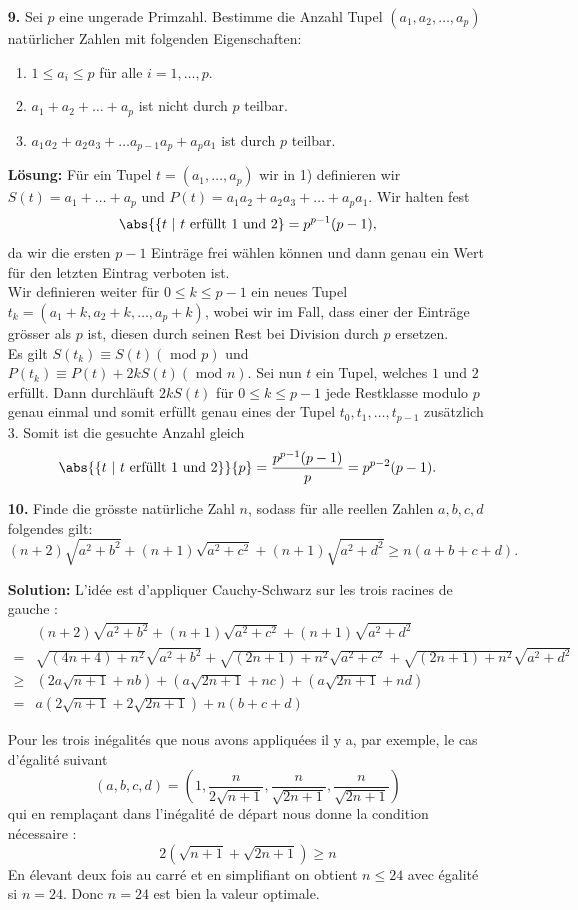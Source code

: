 \documentclass[language=german,style=solution]{smo}
\begin{document}
\begin{enumerate}
\item[\textbf{9.}] Sei $p$ eine ungerade Primzahl. Bestimme die Anzahl Tupel $(a_1,a_2,\dots,a_p)$ natürlicher Zahlen mit folgenden Eigenschaften:
\begin{enumerate}[1)]
\item $1\leq a_i\leq p$ für alle $i=1,\dots,p$.
\item $a_1+a_2+\dots +a_p$ ist nicht durch $p$ teilbar.
\item $a_1a_2 + a_2a_3 +\dots a_{p-1}a_p + a_pa_1$ ist durch $p$ teilbar.
\end{enumerate}

\textbf{Lösung:} Für ein Tupel $t=(a_1,\dots,a_p)$ wir in 1) definieren wir $S(t) = a_1+\dots +a_p$ und $P(t) = a_1a_2+a_2a_3+\dots +a_pa_1$. Wir halten fest
\[
\abs{\{t \ | \ t \text{ erfüllt 1 und 2}} = p^{p-1}(p-1),
\]
da wir die ersten $p-1$ Einträge frei wählen können und dann genau ein Wert für den letzten Eintrag verboten ist.\\
Wir definieren weiter für $0\leq k \leq p-1$ ein neues Tupel $t_k =(a_1+k,a_2+k,\dots,a_p+k)$, wobei wir im Fall, dass einer der Einträge grösser als $p$ ist, diesen durch seinen Rest bei Division durch $p$ ersetzen. \\
Es gilt $S(t_k) \equiv S(t) (\text{ mod }p)$ und $P(t_k) \equiv P(t) + 2kS(t) (\text{ mod }n)$. Sei nun $t$ ein Tupel, welches $1$ und $2$ erfüllt. Dann durchläuft $2kS(t)$ für $0\leq k\leq p-1$ jede Restklasse modulo $p$ genau einmal und somit erfüllt genau eines der Tupel $t_0,t_1,\dots,t_{p-1}$ zusätzlich $3$. Somit ist die gesuchte Anzahl gleich
\[
\abs{\{t \ | \ t \text{ erfüllt 1 und 2\}}}{p}= \frac{p^{p-1}(p-1)}{p}= p^{p-2}(p-1).
\]

\newpage

\item[\textbf{10.}] Finde die grösste natürliche Zahl $n$, sodass für alle reellen Zahlen $a,b,c,d$ folgendes gilt:
\[
(n+2) \sqrt{a^2+b^2} + (n+1) \sqrt{a^2+c^2} + (n+1)\sqrt{a^2+d^2} \geq n(a+b+c+d).
\]

\textbf{Solution:} L'idée est d'appliquer Cauchy-Schwarz sur les trois racines de gauche :
\begin{align*}
&(n+2)\sqrt{a^2+b^2}+(n+1)\sqrt{a^2+c^2}+(n+1)\sqrt{a^2+d^2}\\
= &\sqrt{(4n+4)+n^2}\sqrt{a^2+b^2}+\sqrt{(2n+1)+n^2}\sqrt{a^2+c^2}+\sqrt{(2n+1)+n^2}\sqrt{a^2+d^2}\\
\geq &(2a\sqrt{n+1}+nb)+(a\sqrt{2n+1}+nc)+(a\sqrt{2n+1}+nd)\\
= & a(2\sqrt{n+1}+2\sqrt{2n+1})+n(b+c+d)
\end{align*}

Pour les trois inégalités que nous avons appliquées il y a, par exemple, le cas d'égalité suivant 
\[
	(a,b,c,d)=(1,\frac{n}{2\sqrt{n+1}},\frac{n}{\sqrt{2n+1}},\frac{n}{\sqrt{2n+1}})
\]
qui en remplaçant dans l'inégalité de départ nous donne la condition nécessaire :
\[
	2(\sqrt{n+1}+\sqrt{2n+1})\geq n
\]
En élevant deux fois au carré et en simplifiant on obtient $n \leq 24$ avec égalité si $n=24$. Donc $n=24$ est bien la valeur optimale.

\end{enumerate}
\end{document}
